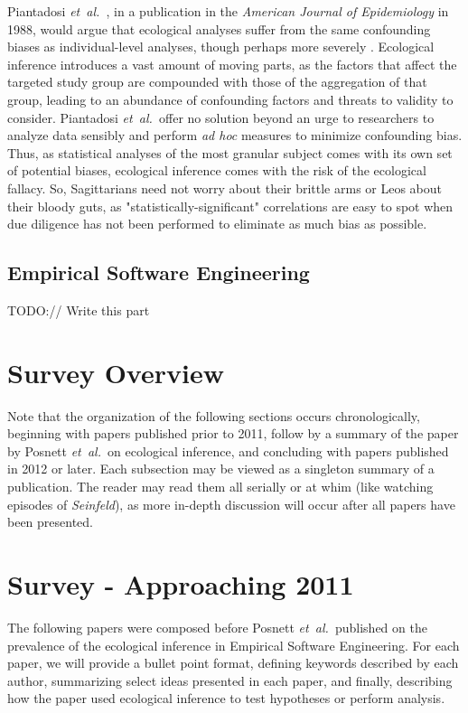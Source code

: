 \documentclass{sig-alternate-05-2015}
\newcommand{\etal}{\mbox{\emph{et al.\ }}}
\begin{document}
Piantadosi \etal, in a publication in the \emph{American Journal of Epidemiology} in 1988, would argue that ecological analyses suffer from the same confounding biases as individual-level analyses, though perhaps more severely \cite{Piantadosi:1988}.  Ecological inference introduces a vast amount of moving parts, as the factors that affect the targeted study group are compounded with those of the aggregation of that group, leading to an abundance of confounding factors and threats to validity to consider. Piantadosi \etal offer no solution beyond an urge to researchers to analyze data sensibly and perform \emph{ad hoc} measures to minimize confounding bias.  Thus, as statistical analyses of the most granular subject comes with its own set of potential biases, ecological inference comes with the risk of the ecological fallacy.  So, Sagittarians need not worry about their brittle arms or Leos about their bloody guts, as "statistically-significant" correlations are easy to spot when due diligence has not been performed to eliminate as much bias as possible.

\subsection{Empirical Software Engineering}
TODO:// Write this part

\section{Survey Overview}

Note that the organization of the following sections occurs chronologically, beginning with papers published prior to 2011, follow by a summary of the paper by Posnett \etal on ecological inference, and concluding with papers published in 2012 or later. Each subsection may be viewed as a singleton summary of a publication.  The reader may read them all serially or at whim (like watching episodes of \emph{Seinfeld}), as more in-depth discussion will occur after all papers have been presented.

\section{Survey - Approaching 2011}

The following papers were composed before Posnett \etal published on the prevalence of the ecological inference in Empirical Software Engineering.  For each paper, we will provide a bullet point format, defining keywords described by each author, summarizing select ideas presented in each paper, and finally, describing how the paper used ecological inference to test hypotheses or perform analysis.
\end{document}
